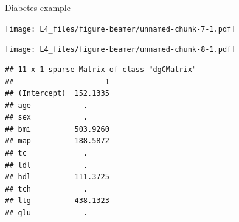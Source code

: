 \documentclass[
  ignorenonframetext,
]{beamer}
\begin{document}
\begin{frame}

\begin{block}{Diabetes example}

\texttt{[image: L4\_files/figure-beamer/unnamed-chunk-7-1.pdf]}

\end{block}

\end{frame}

\begin{frame}

\texttt{[image: L4\_files/figure-beamer/unnamed-chunk-8-1.pdf]}

\end{frame}

\begin{frame}[fragile]

\begin{verbatim}
## 11 x 1 sparse Matrix of class "dgCMatrix"
##                     1
## (Intercept)  152.1335
## age            .     
## sex            .     
## bmi          503.9260
## map          188.5872
## tc             .     
## ldl            .     
## hdl         -111.3725
## tch            .     
## ltg          438.1323
## glu            .
\end{verbatim}

\end{frame}
\end{document}
